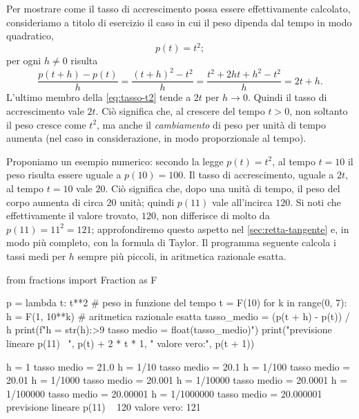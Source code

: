 Per mostrare come il tasso di accrescimento possa essere effettivamente calcolato,
consideriamo a titolo di esercizio il caso in cui il peso dipenda dal tempo in modo
quadratico,
\begin{equation}\label{eq:peso-quadratico}
  p(t)=t^{2};
\end{equation}
per ogni $h\neq0$ risulta
\begin{equation}\label{eq:tasso-t2}
  \frac{p(t+h)-p(t)}{h}=\frac{(t+h)^{2}-t^{2}}{h}=\frac{t^{2}+2ht+h^{2}-t^{2}}{h}=2t+h .
\end{equation}
L'ultimo membro della \eqref{eq:tasso-t2} tende a $2t$ per $h\to0$. Quindi il tasso di
accrescimento vale $2t$. Ciò significa che, al crescere del tempo $t>0$, non soltanto il
peso cresce come $t^{2}$, ma anche il \emph{cambiamento} di peso per unità di tempo
aumenta (nel caso in considerazione, in modo proporzionale al tempo).

Proponiamo un esempio numerico: secondo la legge $p(t)=t^{2}$, al tempo $t=10$ il peso
risulta essere uguale a $p(10)=100$. Il tasso di accrescimento, uguale a $2t$, al tempo
$t=10$ vale $20$. Ciò significa che, dopo una unità di tempo, il peso del corpo aumenta
di circa $20$ unità; quindi $p(11)$ vale all'incirca $120$. Si noti che effettivamente il
valore trovato, $120$, non differisce di molto da $p(11)=11^{2}=121$; approfondiremo
questo aspetto nel \cref{sec:retta-tangente} e, in modo più completo, con la formula di
Taylor. Il programma seguente calcola i tassi medi per $h$ sempre più piccoli, in
aritmetica razionale esatta.

\begin{python}[Tassi medi di accrescimento per $p(t)=t^{2}$ e $t=10$]
from fractions import Fraction as F

p = lambda t: t**2                    # peso in funzione del tempo
t = F(10)
for k in range(0, 7):
    h = F(1, 10**k)                   # aritmetica razionale esatta
    tasso_medio = (p(t + h) - p(t)) / h
    print(f"h = {str(h):>9}   tasso medio = {float(tasso_medio)}")
print("previsione lineare p(11) ~", p(t) + 2 * t * 1,
      "  valore vero:", p(t + 1))
\end{python}
\begin{risultato}
h =         1   tasso medio = 21.0
h =      1/10   tasso medio = 20.1
h =     1/100   tasso medio = 20.01
h =    1/1000   tasso medio = 20.001
h =   1/10000   tasso medio = 20.0001
h =  1/100000   tasso medio = 20.00001
h = 1/1000000   tasso medio = 20.000001
previsione lineare p(11) ~ 120   valore vero: 121
\end{risultato}

